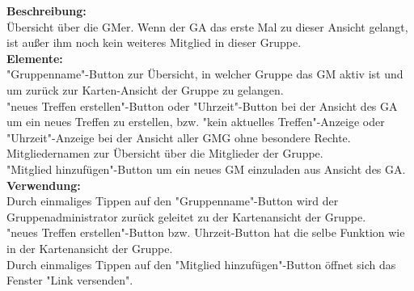 \textbf{Beschreibung:}\\
Übersicht über die GMer. Wenn der GA das erste Mal zu dieser Ansicht gelangt, ist außer ihm noch kein weiteres Mitglied in dieser Gruppe.\\
\textbf{Elemente:}\\
"Gruppenname"-Button zur Übersicht, in welcher Gruppe das GM aktiv ist und um zurück zur Karten-Ansicht der Gruppe zu gelangen.\\
"neues Treffen erstellen"-Button oder "Uhrzeit"-Button bei der Ansicht des GA um ein neues Treffen zu erstellen, bzw. "kein aktuelles Treffen"-Anzeige oder "Uhrzeit"-Anzeige bei der Ansicht aller GMG ohne besondere Rechte.\\
Mitgliedernamen zur Übersicht über die Mitglieder der Gruppe.\\
"Mitglied hinzufügen"-Button um ein neues GM einzuladen aus Ansicht des GA.\\
\textbf{Verwendung:}\\
Durch einmaliges Tippen auf den "Gruppenname"-Button wird der Gruppenadministrator zurück geleitet zu der Kartenansicht der Gruppe.\\
"neues Treffen erstellen"-Button bzw. Uhrzeit-Button hat die selbe Funktion wie in der Kartenansicht der Gruppe.\\
Durch einmaliges Tippen auf den "Mitglied hinzufügen"-Button öffnet sich das Fenster "Link versenden".
\newpage


